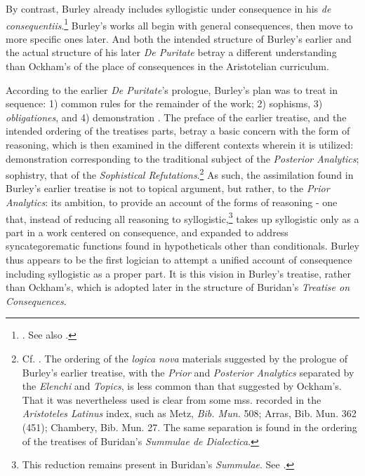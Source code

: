 \documentclass[]{birkjour}
\begin{document}
By contrast, Burley already includes syllogistic under consequence in his \textit{de consequentiis}.\footnote{\autocite[pp. 131-132, par. 82-85]{Green-Pedersen1980b}. See also \autocite[p. 219.19-32]{BurleyDPAL}.} Burley's works all begin with general consequences, then move to more specific ones later. And both the intended structure of Burley's earlier and the actual structure of his later \textit{De Puritate} betray a different understanding than Ockham's of the place of consequences in the Aristotelian curriculum.

According to the earlier \textit{De Puritate}'s prologue, Burley's plan was to treat in sequence: 1) common rules for the remainder of the work; 2) sophisms, 3) \textit{obligationes}, and 4) demonstration \autocite[p. 199]{BurleyDPAL}. The preface of the earlier treatise, and the intended ordering of the treatises parts, betray a basic concern with the form of reasoning, which is then examined in the different contexts wherein it is utilized: demonstration corresponding to the traditional subject of the \textit{Posterior Analytics}; sophistry, that of the \textit{Sophistical Refutations}.\footnote{Cf. \autocite[prol.]{AquinasPA}. The ordering of the \textit{logica nova} materials suggested by the prologue of Burley's earlier treatise, with the \textit{Prior} and \textit{Posterior Analytics} separated by the \textit{Elenchi} and \textit{Topics}, is less common than that suggested by Ockham's. That it was nevertheless used is clear from some mss. recorded in the \textit{Aristoteles Latinus} index, such as Metz, \textit{Bib. Mun.} 508; Arras, Bib. Mun. 362 (451); Chambery, Bib. Mun. 27. The same separation is found in the ordering of the treatises of Buridan's \textit{Summulae de Dialectica}.} As such, the assimilation found in Burley's earlier treatise is not to topical argument, but rather, to the \textit{Prior Analytics}: its ambition, to provide an account of the forms of reasoning - one that, instead of reducing all reasoning to syllogistic,\footnote{This reduction remains present in Buridan's \textit{Summulae}. See \autocite[6.1.5, pp. 398-400]{BuridanKlimaSD}.} takes up syllogistic only as a part in a work centered on consequence, and expanded to address syncategorematic functions found in hypotheticals other than conditionals. Burley thus appears to be the first logician to attempt a unified account of consequence including syllogistic as a proper part. It is this vision in Burley's treatise, rather than Ockham's, which is adopted later in the structure of Buridan's \textit{Treatise on Consequences}.
\end{document}
